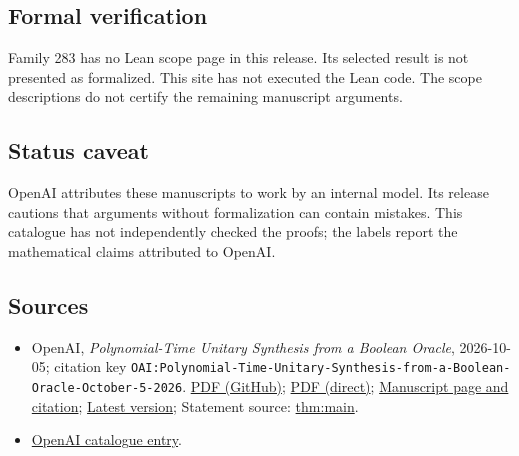 \documentclass[11pt]{article}
\begin{document}
\subsection{Formal verification}
Family 283 has no Lean scope page in this release. Its selected result is not presented as formalized. This site has not executed the Lean code. The scope descriptions do not certify the remaining manuscript arguments.

\subsection{Status caveat}
OpenAI attributes these manuscripts to work by an internal model. Its release cautions that arguments without formalization can contain mistakes. This catalogue has not independently checked the proofs; the labels report the mathematical claims attributed to OpenAI.

\subsection{Sources}
\begin{itemize}
\item OpenAI, \emph{Polynomial-Time Unitary Synthesis from a Boolean Oracle}, 2026-10-05; citation key \texttt{OAI:Polynomial-Time-Unitary-Synthesis-from-a-Boolean-Oracle-October-5-2026}. \href{https://github.com/openai/math/blob/adc7f1241b42e322a6451854ab7e4b4c146bf78a/preprints/Polynomial-Time-Unitary-Synthesis-from-a-Boolean-Oracle-October-5-2026/paper.pdf}{PDF (GitHub)}; \href{https://github.com/openai/math/raw/adc7f1241b42e322a6451854ab7e4b4c146bf78a/preprints/Polynomial-Time-Unitary-Synthesis-from-a-Boolean-Oracle-October-5-2026/paper.pdf}{PDF (direct)}; \href{https://github.com/openai/math/blob/adc7f1241b42e322a6451854ab7e4b4c146bf78a/preprints/Polynomial-Time-Unitary-Synthesis-from-a-Boolean-Oracle-October-5-2026/README.md}{Manuscript page and citation}; \href{https://github.com/openai/math/blob/main/preprints/Polynomial-Time-Unitary-Synthesis-from-a-Boolean-Oracle-October-5-2026/paper.pdf}{Latest version}; Statement source: \href{https://github.com/openai/math/blob/adc7f1241b42e322a6451854ab7e4b4c146bf78a/preprints/Polynomial-Time-Unitary-Synthesis-from-a-Boolean-Oracle-October-5-2026/build/sections/01-introduction.tex\#L46}{thm:main}.
\item \href{https://github.com/openai/math/blob/adc7f1241b42e322a6451854ab7e4b4c146bf78a/CONTENTS.md}{OpenAI catalogue entry}.
\end{itemize}
\end{document}
